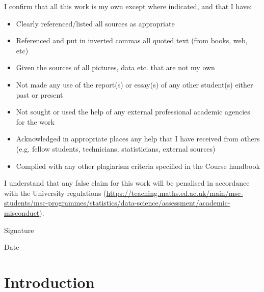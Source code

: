 \documentclass[11pt,twoside]{article}
\numberwithin{Theorem}{section}
\numberwithin{Definition}{section}
\numberwithin{Lemma}{section}
\numberwithin{Algorithm}{section}
\numberwithin{equation}{section}
\newcommand{\dottedline}[1]{\makebox[#1]{.\dotfill}}
\begin{document}
I confirm that all this work is my own except where indicated, and that I have:
\begin{itemize}
\item	Clearly referenced/listed all sources as appropriate	 				
\item	Referenced and put in inverted commas all quoted text (from books, web, etc)	
\item	Given the sources of all pictures, data etc. that are not my own				
\item	Not made any use of the report(s) or essay(s) of any other student(s) either past 	
or present	
\item	Not sought or used the help of any external professional academic agencies for the work
\item	Acknowledged in appropriate places any help that I have received from others	(e.g. fellow students, technicians, statisticians, external sources)
\item	Complied with any other plagiarism criteria specified in the Course handbook
\end{itemize}

I understand that any false claim for this work will be penalised in accordance with
the University regulations	(\url{https://teaching.maths.ed.ac.uk/main/msc-students/msc-programmes/statistics/data-science/assessment/academic-misconduct}).								

\vspace{1cm}

Signature \dottedline{8cm}

\vspace{5mm}

Date \dottedline{8cm}


\clearpage



\pagestyle{plain}
\setcounter{page}{1}

\tableofcontents
\clearpage
\listoftables
\listoffigures
\cleardoublepage

\setcounter{page}{1}

\nocite{*}

\clearpage

\section{Introduction}
\label{sec:intro}
\end{document}

